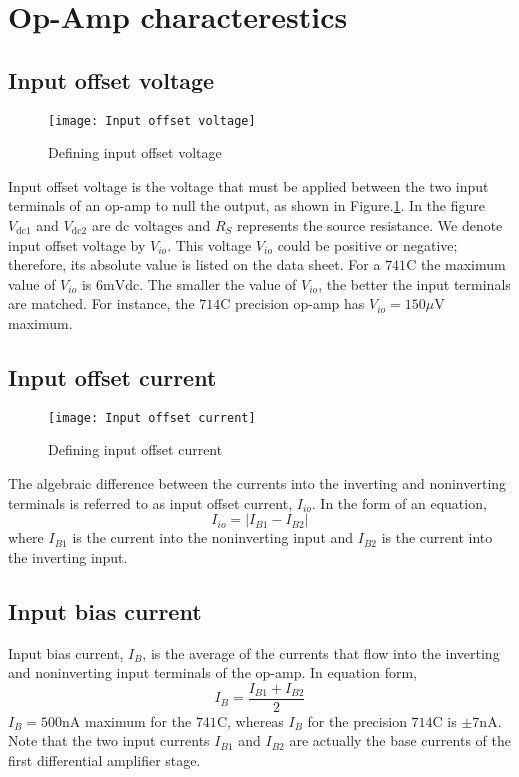   \section{Op-Amp characterestics}
  \subsection{Input offset voltage} 
  
   \begin{figure}[H]
   	\centering
   	\texttt{[image: Input offset voltage]}
   	\caption{Defining input offset voltage}
   	\label{Input offset voltage}
   \end{figure}
   \par Input offset voltage is the voltage that must be applied between the two input terminals of an op-amp to null the output, as shown in Figure.\ref{Input offset voltage}. In the figure $V_{\mathrm{dc} 1}$ and $V_{\mathrm{dc} 2}$ are dc voltages and $R_{S}$ represents the source resistance. We denote input offset voltage by $V_{i o}$. This voltage $V_{i o}$ could be positive or negative; therefore, its absolute value is listed on the data sheet. For a $741 \mathrm{C}$ the maximum value of $V_{i o}$ is $6 \mathrm{mV} \mathrm{dc}$. The smaller the value of $V_{i o}$, the better the input terminals are matched. For instance, the $714 \mathrm{C}$ precision op-amp has $V_{i o}=150 \mu \mathrm{V}$ maximum.
   \subsection{Input offset current}
   \begin{figure}[H]
   	\centering
   	\texttt{[image: Input offset current]}
   	\caption{Defining input offset current}
   	\label{Input offset current}
   \end{figure}
    The algebraic difference between the currents into the inverting and noninverting terminals is referred to as input offset current, $I_{i o}$. In the form of an equation,
   $$
   I_{i o}=\left|I_{B 1}-I_{B 2}\right|
   $$
   where $I_{B 1}$ is the current into the noninverting input and $I_{B 2}$ is the current into the inverting input.
   \subsection{Input bias current}
   Input bias current, $I_{B}$, is the average of the currents that flow into the inverting and noninverting input terminals of the op-amp. In equation form,
   $$
   I_{B}=\frac{I_{B 1}+I_{B 2}}{2}
   $$
   $I_{B}=500 \mathrm{nA}$ maximum for the $741 \mathrm{C}$, whereas $I_{B}$ for the precision $714 \mathrm{C}$ is $\pm 7 \mathrm{nA} .$ \\
   Note that the two input currents $I_{B 1}$ and $I_{B 2}$ are actually the base currents of the first differential amplifier stage.
